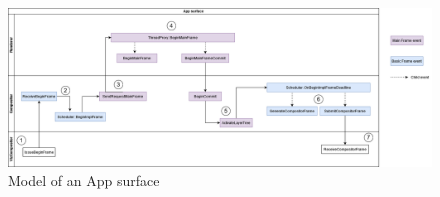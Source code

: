 \documentclass{kththesis}
\begin{document}
\paragraph{}

\begin{figure}
    \centering
    \includegraphics[width=\linewidth]{kththesis/Figures/App_surface.png}
    \caption{Model of an App surface}
    \label{fig:app_surface}
\end{figure}
\end{document}
